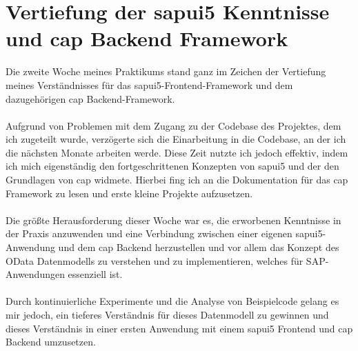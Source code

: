 \section{Vertiefung der \acs{sapui5} Kenntnisse und \acs{cap} Backend Framework}
Die zweite Woche meines Praktikums stand ganz im Zeichen der Vertiefung meines Verständnisses für das \acs{sapui5}-Frontend-Framework und dem dazugehörigen \acs{cap} Backend-Framework. \\\\
Aufgrund von Problemen mit dem Zugang zu der Codebase des Projektes, dem ich zugeteilt wurde, verzögerte sich die Einarbeitung in die Codebase, an der ich die nächsten Monate arbeiten werde. Diese Zeit nutzte ich jedoch effektiv, indem ich mich eigenständig den fortgeschrittenen Konzepten von \acs{sapui5} und der den Grundlagen von \acs{cap} widmete. Hierbei fing ich an die Dokumentation für das \acs{cap} Framework zu lesen und erste kleine Projekte aufzusetzen. \\\\
Die größte Herausforderung dieser Woche war es, die erworbenen Kenntnisse in der Praxis anzuwenden und eine Verbindung zwischen einer eigenen \acs{sapui5}-Anwendung und dem \acs{cap} Backend herzustellen und vor allem das Konzept des OData Datenmodells zu verstehen und zu implementieren, welches für SAP-Anwendungen essenziell ist. \\\\
Durch kontinuierliche Experimente und die Analyse von Beispielcode gelang es mir jedoch, ein tieferes Verständnis für dieses Datenmodell zu gewinnen und dieses Verständnis in einer ersten Anwendung mit einem \acs{sapui5} Frontend und \acs{cap} Backend umzusetzen. \\\\

